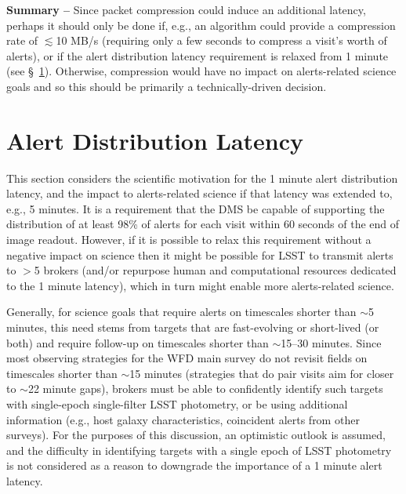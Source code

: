 \documentclass[DM,lsstdraft,authoryear,toc]{lsstdoc}
\begin{document}
{\bf Summary --} Since packet compression could induce an additional latency, perhaps it should only be done if, e.g., an algorithm could provide a compression rate of $\lesssim$10 MB/s (requiring only a few seconds to compress a visit's worth of alerts), or if the alert distribution latency requirement is relaxed from 1 minute (see \S~\ref{sec:latency}).
Otherwise, compression would have no impact on alerts-related science goals and so this should be primarily a technically-driven decision.




\clearpage
\section{Alert Distribution Latency} \label{sec:latency}

This section considers the scientific motivation for the 1 minute alert distribution latency, and the impact to alerts-related science if that latency was extended to, e.g., 5 minutes.
It is a requirement that the DMS be capable of supporting the distribution of at least 98\% of alerts for each visit within 60 seconds of the end of image readout.
However, if it is possible to relax this requirement without a negative impact on science then it might be possible for LSST to transmit alerts to $>$5 brokers (and/or repurpose human and computational resources dedicated to the 1 minute latency), which in turn might enable more alerts-related science.

Generally, for science goals that require alerts on timescales shorter than $\sim$5 minutes, this need stems from targets that are fast-evolving or short-lived (or both) and require follow-up on timescales shorter than $\sim$15--30 minutes.
Since most observing strategies for the WFD main survey do not revisit fields on timescales shorter than $\sim$15 minutes (strategies that do pair visits aim for closer to $\sim$22 minute gaps), brokers must be able to confidently identify such targets with single-epoch single-filter LSST photometry, or be using additional information (e.g., host galaxy characteristics, coincident alerts from other surveys).
For the purposes of this discussion, an optimistic outlook is assumed, and the difficulty in identifying targets with a single epoch of LSST photometry is not considered as a reason to downgrade the importance of a 1 minute alert latency.
\end{document}
